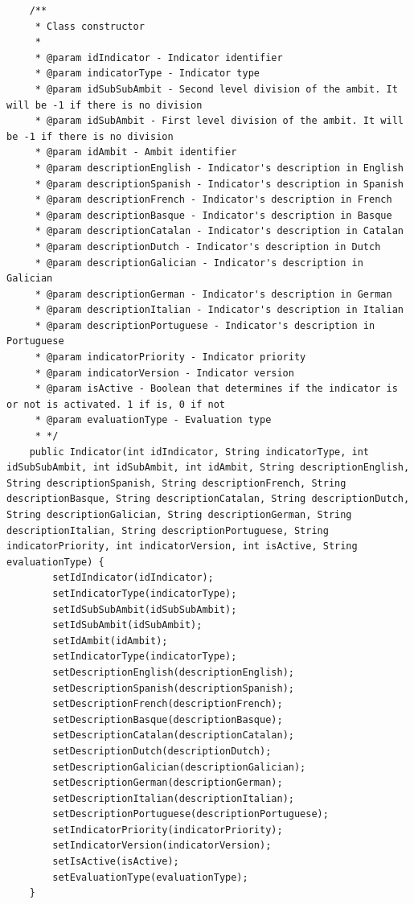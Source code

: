 \begin{itemize}
\begin{itemize}
\begin{lstlisting}
    /**
     * Class constructor
     *
     * @param idIndicator - Indicator identifier
     * @param indicatorType - Indicator type
     * @param idSubSubAmbit - Second level division of the ambit. It will be -1 if there is no division
     * @param idSubAmbit - First level division of the ambit. It will be -1 if there is no division
     * @param idAmbit - Ambit identifier
     * @param descriptionEnglish - Indicator's description in English
     * @param descriptionSpanish - Indicator's description in Spanish
     * @param descriptionFrench - Indicator's description in French
     * @param descriptionBasque - Indicator's description in Basque
     * @param descriptionCatalan - Indicator's description in Catalan
     * @param descriptionDutch - Indicator's description in Dutch
     * @param descriptionGalician - Indicator's description in Galician
     * @param descriptionGerman - Indicator's description in German
     * @param descriptionItalian - Indicator's description in Italian
     * @param descriptionPortuguese - Indicator's description in Portuguese
     * @param indicatorPriority - Indicator priority
     * @param indicatorVersion - Indicator version
     * @param isActive - Boolean that determines if the indicator is or not is activated. 1 if is, 0 if not
     * @param evaluationType - Evaluation type
     * */
    public Indicator(int idIndicator, String indicatorType, int idSubSubAmbit, int idSubAmbit, int idAmbit, String descriptionEnglish, String descriptionSpanish, String descriptionFrench, String descriptionBasque, String descriptionCatalan, String descriptionDutch, String descriptionGalician, String descriptionGerman, String descriptionItalian, String descriptionPortuguese, String indicatorPriority, int indicatorVersion, int isActive, String evaluationType) {
        setIdIndicator(idIndicator);
        setIndicatorType(indicatorType);
        setIdSubSubAmbit(idSubSubAmbit);
        setIdSubAmbit(idSubAmbit);
        setIdAmbit(idAmbit);
        setIndicatorType(indicatorType);
        setDescriptionEnglish(descriptionEnglish);
        setDescriptionSpanish(descriptionSpanish);
        setDescriptionFrench(descriptionFrench);
        setDescriptionBasque(descriptionBasque);
        setDescriptionCatalan(descriptionCatalan);
        setDescriptionDutch(descriptionDutch);
        setDescriptionGalician(descriptionGalician);
        setDescriptionGerman(descriptionGerman);
        setDescriptionItalian(descriptionItalian);
        setDescriptionPortuguese(descriptionPortuguese);
        setIndicatorPriority(indicatorPriority);
        setIndicatorVersion(indicatorVersion);
        setIsActive(isActive);
        setEvaluationType(evaluationType);
    }


\end{lstlisting}
\end{itemize}
\end{itemize}
